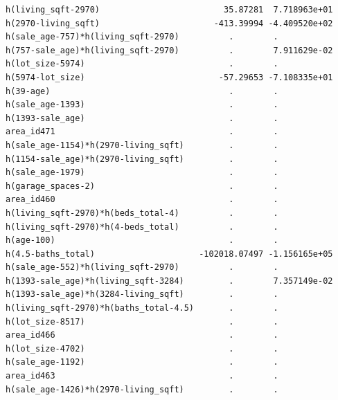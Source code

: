 \documentclass[
]{article}
\begin{document}
\begin{verbatim}
h(living_sqft-2970)                         35.87281  7.718963e+01
h(2970-living_sqft)                       -413.39994 -4.409520e+02
h(sale_age-757)*h(living_sqft-2970)          .        .           
h(757-sale_age)*h(living_sqft-2970)          .        7.911629e-02
h(lot_size-5974)                             .        .           
h(5974-lot_size)                           -57.29653 -7.108335e+01
h(39-age)                                    .        .           
h(sale_age-1393)                             .        .           
h(1393-sale_age)                             .        .           
area_id471                                   .        .           
h(sale_age-1154)*h(2970-living_sqft)         .        .           
h(1154-sale_age)*h(2970-living_sqft)         .        .           
h(sale_age-1979)                             .        .           
h(garage_spaces-2)                           .        .           
area_id460                                   .        .           
h(living_sqft-2970)*h(beds_total-4)          .        .           
h(living_sqft-2970)*h(4-beds_total)          .        .           
h(age-100)                                   .        .           
h(4.5-baths_total)                     -102018.07497 -1.156165e+05
h(sale_age-552)*h(living_sqft-2970)          .        .           
h(1393-sale_age)*h(living_sqft-3284)         .        7.357149e-02
h(1393-sale_age)*h(3284-living_sqft)         .        .           
h(living_sqft-2970)*h(baths_total-4.5)       .        .           
h(lot_size-8517)                             .        .           
area_id466                                   .        .           
h(lot_size-4702)                             .        .           
h(sale_age-1192)                             .        .           
area_id463                                   .        .           
h(sale_age-1426)*h(2970-living_sqft)         .        .           
                                                                  

\end{verbatim}
\end{document}
